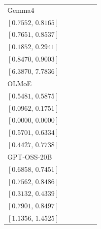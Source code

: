 \begin{tabular*}{\linewidth}{@{\extracolsep{\fill}}lccccc@{}}
Gemma4 & \begin{tabular}[t]{@{}c@{}}\(0.7862\)\\\([0.7552,\,0.8165]\)\end{tabular} & \begin{tabular}[t]{@{}c@{}}\(0.8103\)\\\([0.7651,\,0.8537]\)\end{tabular} & \begin{tabular}[t]{@{}c@{}}\(0.2379\)\\\([0.1852,\,0.2941]\)\end{tabular} & \begin{tabular}[t]{@{}c@{}}\(0.8744\)\\\([0.8470,\,0.9003]\)\end{tabular} & \begin{tabular}[t]{@{}c@{}}\(7.0863\)\\\([6.3870,\,7.7836]\)\end{tabular}\\[2pt]
OLMoE & \begin{tabular}[t]{@{}c@{}}\(0.5672\)\\\([0.5481,\,0.5875]\)\end{tabular} & \begin{tabular}[t]{@{}c@{}}\(0.1345\)\\\([0.0962,\,0.1751]\)\end{tabular} & \begin{tabular}[t]{@{}c@{}}\(0.0000\)\\\([0.0000,\,0.0000]\)\end{tabular} & \begin{tabular}[t]{@{}c@{}}\(0.6018\)\\\([0.5701,\,0.6334]\)\end{tabular} & \begin{tabular}[t]{@{}c@{}}\(0.6056\)\\\([0.4427,\,0.7738]\)\end{tabular}\\[2pt]
GPT-OSS-20B & \begin{tabular}[t]{@{}c@{}}\(0.7155\)\\\([0.6858,\,0.7451]\)\end{tabular} & \begin{tabular}[t]{@{}c@{}}\(0.8034\)\\\([0.7562,\,0.8486]\)\end{tabular} & \begin{tabular}[t]{@{}c@{}}\(0.3724\)\\\([0.3132,\,0.4339]\)\end{tabular} & \begin{tabular}[t]{@{}c@{}}\(0.8202\)\\\([0.7901,\,0.8497]\)\end{tabular} & \begin{tabular}[t]{@{}c@{}}\(1.2942\)\\\([1.1356,\,1.4525]\)\end{tabular}\\[2pt]

\end{tabular*}
